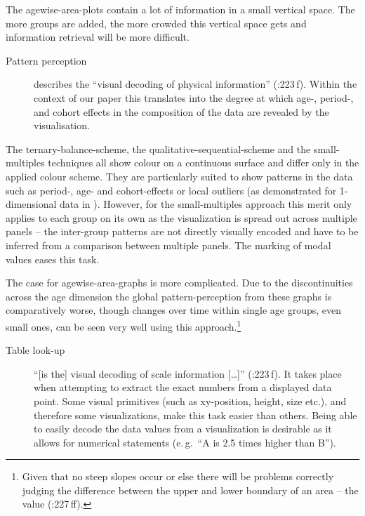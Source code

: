 \documentclass[parskip=half]{scrartcl}
\begin{document}
The agewise-area-plots contain a lot of information in a small vertical space. The more groups are added, the more crowded this vertical space gets and information retrieval will be more difficult.

\begin{description}
  \item[Pattern perception] describes the \enquote{visual decoding of physical information} (\cite{Cleveland1994}:223\,f). Within the context of our paper this translates into the degree at which age-, period-, and cohort effects in the composition of the data are revealed by the visualisation.
\end{description}

The ternary-balance-scheme, the qualitative-sequential-scheme and the small-multiples techniques all show colour on a continuous surface and differ only in the applied colour scheme. They are particularly suited to show patterns in the data such as period-, age- and cohort-effects or local outliers (as demonstrated for 1-dimensional data in \cite{Vaupel1987}). However, for the small-multiples approach this merit only applies to each group on its own as the visualization is spread out across multiple panels -- the inter-group patterns are not directly visually encoded and have to be inferred from a comparison between multiple panels. The marking of modal values eases this task.

The case for agewise-area-graphs is more complicated. Due to the discontinuities across the age dimension the global pattern-perception from these graphs is comparatively worse, though changes over time within single age groups, even small ones, can be seen very well using this approach.\footnote{
  Given that no steep slopes occur or else there will be problems correctly judging the difference between the upper and lower boundary of an area -- the value (\cite{Cleveland1994}:227\,ff).
}

\begin{description}
  \item[Table look-up] \enquote{[is the] visual decoding of scale information [\ldots]} (\cite{Cleveland1994}:223\,f). It takes place when attempting to extract the exact numbers from a displayed data point. Some visual primitives (such as xy-position, height, size etc.), and therefore some visualizations, make this task easier than others. Being able to easily decode the data values from a visualization is desirable as it allows for numerical statements (e.\,g.~\enquote{A is 2.5 times higher than B}).
\end{description}
\end{document}
